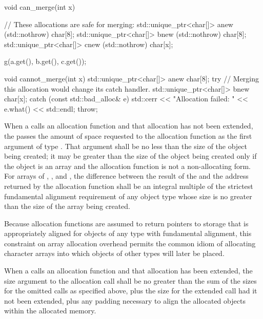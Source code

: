 \begin{example}
\begin{codeblock}
void can_merge(int x) {
  // These allocations are safe for merging:
  std::unique_ptr<char[]> a{new (std::nothrow) char[8]};
  std::unique_ptr<char[]> b{new (std::nothrow) char[8]};
  std::unique_ptr<char[]> c{new (std::nothrow) char[x]};

  g(a.get(), b.get(), c.get());
}

void cannot_merge(int x) {
  std::unique_ptr<char[]> a{new char[8]};
  try {
    // Merging this allocation would change its catch handler.
    std::unique_ptr<char[]> b{new char[x]};
  } catch (const std::bad_alloc& e) {
    std::cerr << "Allocation failed: " << e.what() << std::endl;
    throw;
  }
}
\end{codeblock}
\end{example}

\pnum
When a  calls an allocation function and that
allocation has not been extended, the
 passes the amount of space requested to the
allocation function as the first argument of type
. That argument shall be no less than the size
of the object being created; it may be greater than the size of the
object being created only if the object is an array and
the allocation function is not a non-allocating form.
For arrays of
, , and ,
the difference between the
result of the  and the address returned by the
allocation function shall be an integral multiple of the
strictest fundamental
alignment requirement of any object type whose size
is no greater than the size of the array being created.
\begin{note}
%
Because allocation functions are assumed to return pointers to storage
that is appropriately aligned for objects of any type
with fundamental alignment, this constraint
on array allocation overhead permits the common idiom of allocating
character arrays into which objects of other types will later be placed.
\end{note}

\pnum
When a  calls an allocation function and that
allocation has been extended, the size argument to the allocation call shall
be no greater than the sum of the sizes for the omitted calls as specified
above, plus the size for the extended call had it not been extended, plus any
padding necessary to align the allocated objects within the allocated memory.

